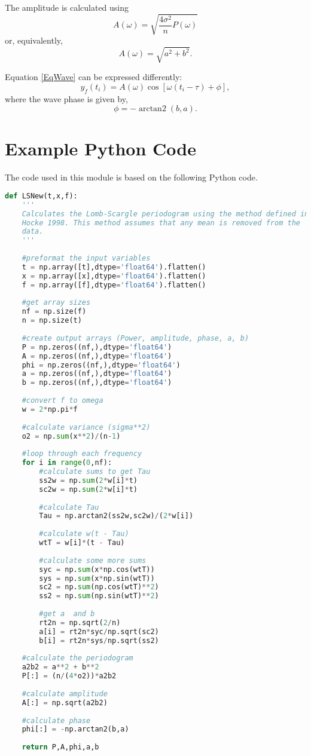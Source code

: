 \documentclass[a4paper,10pt]{article}
\DeclareMathOperator{\atantwo}{arctan2}
\begin{document}
The amplitude is calculated using 
\begin{equation}
	A(\omega) = \sqrt{\frac{4\sigma^2}{n}P(\omega)}
\end{equation}
or, equivalently,
\begin{equation}
	A(\omega) = \sqrt{a^2 + b^2}.
\end{equation}

Equation \ref{EqWave} can be expressed differently:
\begin{equation}
	y_f(t_i) = A(\omega) \cos{\left[\omega (t_i - \tau) + \phi \right]},
\end{equation}
where the wave phase is given by,
\begin{equation}
	\phi = -\atantwo(b,a).
\end{equation}

\section{Example Python Code}
The code used in this module is based on the following Python code.
						
						
\begin{lstlisting}[language=Python]
def LSNew(t,x,f):
	'''
	Calculates the Lomb-Scargle periodogram using the method defined in
	Hocke 1998. This method assumes that any mean is removed from the
	data.
	'''
	
	#preformat the input variables
	t = np.array([t],dtype='float64').flatten()
	x = np.array([x],dtype='float64').flatten()
	f = np.array([f],dtype='float64').flatten()
	
	#get array sizes
	nf = np.size(f)
	n = np.size(t)
	
	#create output arrays (Power, amplitude, phase, a, b)
	P = np.zeros((nf,),dtype='float64')
	A = np.zeros((nf,),dtype='float64')
	phi = np.zeros((nf,),dtype='float64')
	a = np.zeros((nf,),dtype='float64')
	b = np.zeros((nf,),dtype='float64')
	
	#convert f to omega
	w = 2*np.pi*f
	
	#calculate variance (sigma**2)
	o2 = np.sum(x**2)/(n-1)
	
	#loop through each frequency
	for i in range(0,nf):
		#calculate sums to get Tau
		ss2w = np.sum(2*w[i]*t)
		sc2w = np.sum(2*w[i]*t)
	
		#calculate Tau
		Tau = np.arctan2(ss2w,sc2w)/(2*w[i])
		
		#calculate w(t - Tau)
		wtT = w[i]*(t - Tau)
		
		#calculate some more sums
		syc = np.sum(x*np.cos(wtT))
		sys = np.sum(x*np.sin(wtT))
		sc2 = np.sum(np.cos(wtT)**2)
		ss2 = np.sum(np.sin(wtT)**2)
	
		#get a  and b
		rt2n = np.sqrt(2/n)
		a[i] = rt2n*syc/np.sqrt(sc2)
		b[i] = rt2n*sys/np.sqrt(ss2)
	
	#calculate the periodogram
	a2b2 = a**2 + b**2
	P[:] = (n/(4*o2))*a2b2
	
	#calculate amplitude
	A[:] = np.sqrt(a2b2)
	
	#calculate phase
	phi[:] = -np.arctan2(b,a)
	
	return P,A,phi,a,b
\end{lstlisting}


\end{document}
